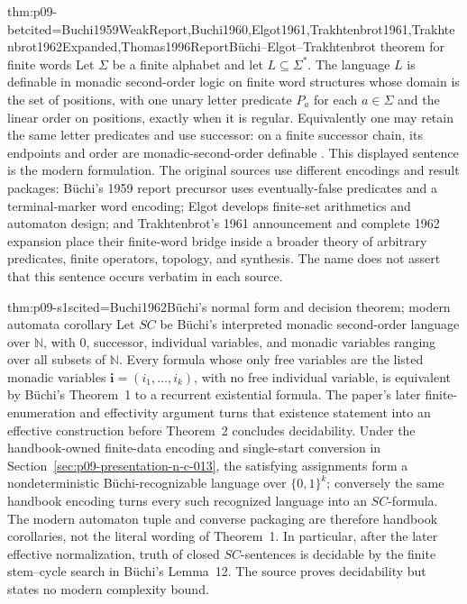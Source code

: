 \begin{hbtheorem}{thm:p09-bet}{cited=Buchi1959WeakReport,Buchi1960,Elgot1961,Trakhtenbrot1961,Trakhtenbrot1962Expanded,Thomas1996Report}{B\"uchi--Elgot--Trakhtenbrot theorem for finite words}
Let \(\Sigma\) be a finite alphabet and let \(L\subseteq\Sigma^*\).  The
language \(L\) is definable in monadic second-order logic on finite word
structures whose domain is the set of positions, with one unary letter
predicate \(P_a\) for each \(a\in\Sigma\) and the linear order on positions,
exactly when it is regular.  Equivalently one may retain the same letter
predicates and use successor: on a finite successor chain, its endpoints and
order are monadic-second-order definable
\cite{Buchi1959WeakReport,Buchi1960,Elgot1961,Trakhtenbrot1961,
Trakhtenbrot1962Expanded,Thomas1996Report}.
This displayed sentence is the modern formulation.  The original sources use
different encodings and result packages: B\"uchi's 1959 report
precursor uses eventually-false predicates and a terminal-marker word
encoding; Elgot develops finite-set arithmetics and automaton design; and
Trakhtenbrot's 1961 announcement and complete 1962 expansion place their
finite-word bridge inside a broader theory of arbitrary predicates, finite
operators, topology, and synthesis.  The name does not assert that this
sentence occurs verbatim in each source.
\end{hbtheorem}

\begin{hbtheorem}{thm:p09-s1s}{cited=Buchi1962}{B\"uchi's normal form and decision theorem; modern automata corollary}
Let \(SC\) be B\"uchi's interpreted monadic second-order language over
\(\mathbb N\), with \(0\), successor, individual variables, and monadic
variables ranging over all subsets of \(\mathbb N\).  Every formula whose only
free variables are the listed monadic variables
\(\mathbf i=(i_1,\ldots,i_k)\), with no free individual variable, is
equivalent by B\"uchi's Theorem~1 to a recurrent existential formula.  The
paper's later finite-enumeration and effectivity argument turns that existence
statement into an effective construction before Theorem~2 concludes
decidability.  Under the handbook-owned finite-data encoding and single-start
conversion in Section~\ref{sec:p09-presentation-n-c-013}, the satisfying
assignments form a nondeterministic B\"uchi-recognizable language over
\(\{0,1\}^k\); conversely the same handbook encoding turns every such
recognized language into an \(SC\)-formula.  The modern automaton tuple and
converse packaging are therefore handbook corollaries, not the literal wording
of Theorem~1.  In particular, after the later effective normalization, truth
of closed \(SC\)-sentences is decidable by the finite stem--cycle search in
B\"uchi's Lemma~12.  The source proves decidability but states no modern
complexity bound.
\end{hbtheorem}

